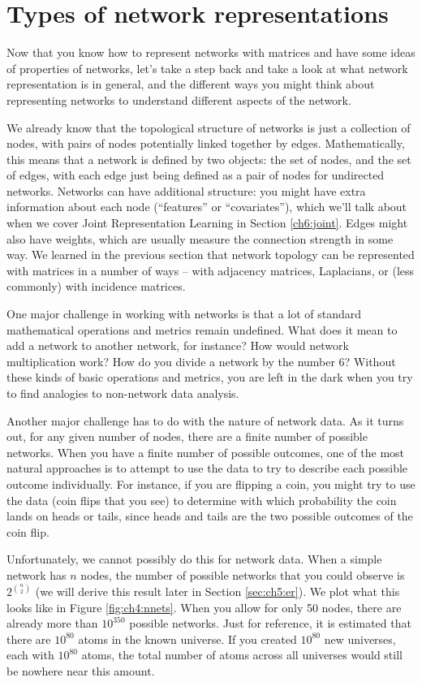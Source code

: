 \section{Types of network representations}
\label{sec:ch4:net-rep}

Now that you know how to represent networks with matrices and have some ideas of properties of networks, let's take a step back and take a look at what network representation is in general, and the different ways you might think about representing networks to understand different aspects of the network.

We already know that the topological structure of networks is just a collection of nodes, with pairs of nodes potentially linked together by edges. Mathematically, this means that a network is defined by two objects: the set of nodes, and the set of edges, with each edge just being defined as a pair of nodes for undirected networks. Networks can have additional structure: you might have extra information about each node (``features'' or ``covariates''), which we'll talk about when we cover Joint Representation Learning in Section \ref{ch6:joint}. Edges might also have weights, which are usually measure the connection strength in some way. We learned in the previous section that network topology can be represented with matrices in a number of ways -- with adjacency matrices, Laplacians, or (less commonly) with incidence matrices. 

One major challenge in working with networks is that a lot of standard mathematical operations and metrics remain undefined. What does it mean to add a network to another network, for instance? How would network multiplication work? How do you divide a network by the number 6? Without these kinds of basic operations and metrics, you are left in the dark when you try to find analogies to non-network data analysis.

Another major challenge has to do with the nature of network data. As it turns out, for any given number of nodes, there are a finite number of possible networks. When you have a finite number of possible outcomes, one of the most natural approaches is to attempt to use the data to try to describe each possible outcome individually. For instance, if you are flipping a coin, you might try to use the data (coin flips that you see) to determine with which probability the coin lands on heads or tails, since heads and tails are the two possible outcomes of the coin flip.

Unfortunately, we cannot possibly do this for network data. When a simple network has $n$ nodes, the number of possible networks that you could observe is $2^{\binom n 2}$ (we will derive this result later in Section \ref{sec:ch5:er}). We plot what this looks like in Figure \ref{fig:ch4:nnets}. When you allow for only 50 nodes, there are already more than $10^{350}$ possible networks. Just for reference, it is estimated that there are $10^{80}$ atoms in the known universe. If you created $10^{80}$ new universes, each with $10^{80}$ atoms, the total number of atoms across all universes would still be nowhere near this amount. 

